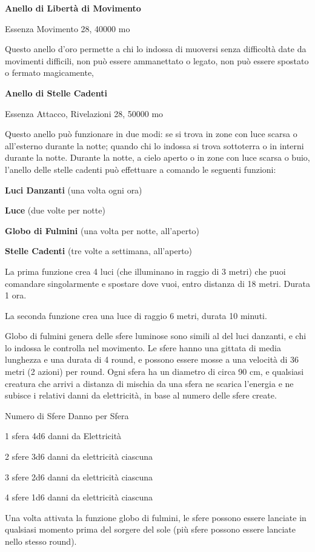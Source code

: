 \documentclass[a4paper,11pt,twoside,openany]{book}
\begin{document}
\textbf{Anello di Libertà di Movimento}

Essenza Movimento 28, 40000 mo

Questo anello d'oro permette a chi lo indossa di muoversi senza difficoltà date da movimenti difficili, non può essere ammanettato o legato, non può essere spostato o fermato magicamente,

\textbf{Anello di Stelle Cadenti}

Essenza Attacco, Rivelazioni 28, 50000 mo

Questo anello può funzionare in due modi: se si trova in zone con luce scarsa o all'esterno durante la notte; quando chi lo indossa si trova sottoterra o in interni durante la notte. Durante la notte, a cielo aperto o in zone con luce scarsa o buio, l'anello delle stelle cadenti può effettuare a comando le seguenti funzioni:

\textbf{Luci Danzanti} (una volta ogni ora)

\textbf{Luce} (due volte per notte)

\textbf{Globo di Fulmini} (una volta per notte, all'aperto)

\textbf{Stelle Cadenti} (tre volte a settimana, all'aperto)

La prima funzione crea 4 luci (che illuminano in raggio di 3 metri) che puoi comandare singolarmente e spostare dove vuoi, entro distanza di 18 metri. Durata 1 ora.

La seconda funzione crea una luce di raggio 6 metri, durata 10 minuti.

Globo di fulmini genera delle sfere luminose sono simili al del luci danzanti, e chi lo indossa le controlla nel movimento. Le sfere hanno una gittata di media lunghezza e una durata di 4 round, e possono essere mosse a una velocità di 36 metri (2 azioni) per round. Ogni sfera ha un diametro di circa 90 cm, e qualsiasi creatura che arrivi a distanza di mischia da una sfera ne scarica l'energia e ne subisce i relativi danni da elettricità, in base al numero delle sfere create.

Numero di Sfere Danno per Sfera

1 sfera 4d6 danni da Elettricità

2 sfere 3d6 danni da elettricità ciascuna

3 sfere 2d6 danni da elettricità ciascuna

4 sfere 1d6 danni da elettricità ciascuna

Una volta attivata la funzione globo di fulmini, le sfere possono essere lanciate in qualsiasi momento prima del sorgere del sole (più sfere possono essere lanciate nello stesso round).
\end{document}
